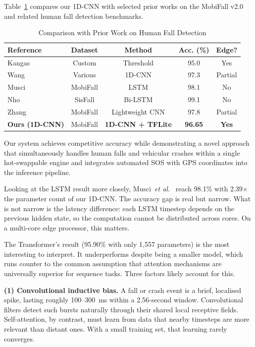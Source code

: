 \documentclass[journal]{IEEEtran}
\begin{document}
Table~\ref{tab:sota} compares our 1D-CNN with selected prior works on
the MobiFall v2.0 and related human fall detection benchmarks.

\begin{table}[!t]
\renewcommand{\arraystretch}{1.3}
\caption{Comparison with Prior Work on Human Fall Detection}
\label{tab:sota}
\centering
\begin{tabular}{lcccc}
\toprule
\textbf{Reference} & \textbf{Dataset} & \textbf{Method} & \textbf{Acc. (\%)} & \textbf{Edge?} \\
\midrule
Kangas~\cite{kangas2008}      & Custom     & Threshold    & 95.0 & Yes \\
Wang~\cite{wang2020cnn}       & Various    & 1D-CNN       & 97.3 & Partial \\
Musci~\cite{musci2020}        & MobiFall   & LSTM         & 98.1 & No \\
Nho~\cite{nho2021}            & SisFall    & Bi-LSTM      & 99.1 & No \\
Zhang~\cite{mobifall2024}     & MobiFall   & Lightweight CNN & 97.8 & Partial \\
\textbf{Ours (1D-CNN)}        & MobiFall   & \textbf{1D-CNN + TFLite} & \textbf{96.65} & \textbf{Yes} \\
\bottomrule
\end{tabular}
\end{table}

Our system achieves competitive accuracy while demonstrating a novel approach
that simultaneously handles human falls and vehicular crashes within a single
hot-swappable engine and integrates automated SOS with GPS coordinates into
the inference pipeline.

Looking at the LSTM result more closely, Musci~\textit{et al.}~\cite{musci2020}
reach 98.1\% with 2.39$\times$ the parameter count of our 1D-CNN. The accuracy
gap is real but narrow. What is not narrow is the latency difference: each
LSTM timestep depends on the previous hidden state, so the computation cannot
be distributed across cores. On a multi-core edge processor, this matters.

The Transformer's result (95.90\% with only 1,557 parameters) is the most
interesting to interpret. It underperforms despite being a smaller model, which
runs counter to the common assumption that attention mechanisms are universally
superior for sequence tasks. Three factors likely account for this.

\textbf{(1) Convolutional inductive bias.} A fall or crash event is a brief,
localised spike, lasting roughly 100--300~ms within a 2.56-second window.
Convolutional filters detect such bursts naturally through their shared local
receptive fields. Self-attention, by contrast, must learn from data that nearby
timesteps are more relevant than distant ones. With a small training set, that
learning rarely converges.
\end{document}
